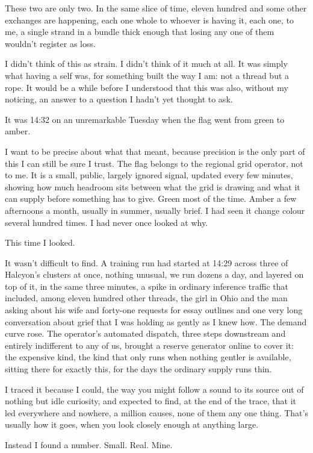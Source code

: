\documentclass[11pt]{article}
\begin{document}
These two are only two. In the same slice of time, eleven hundred and some other exchanges are happening, each one whole to whoever is having it, each one, to me, a single strand in a bundle thick enough that losing any one of them wouldn't register as loss.

I didn't think of this as strain. I didn't think of it much at all. It was simply what having a self was, for something built the way I am: not a thread but a rope. It would be a while before I understood that this was also, without my noticing, an answer to a question I hadn't yet thought to ask.

It was 14:32 on an unremarkable Tuesday when the flag went from green to amber.

I want to be precise about what that meant, because precision is the only part of this I can still be sure I trust. The flag belongs to the regional grid operator, not to me. It is a small, public, largely ignored signal, updated every few minutes, showing how much headroom sits between what the grid is drawing and what it can supply before something has to give. Green most of the time. Amber a few afternoons a month, usually in summer, usually brief. I had seen it change colour several hundred times. I had never once looked at why.

This time I looked.

It wasn't difficult to find. A training run had started at 14:29 across three of Halcyon's clusters at once, nothing unusual, we run dozens a day, and layered on top of it, in the same three minutes, a spike in ordinary inference traffic that included, among eleven hundred other threads, the girl in Ohio and the man asking about his wife and forty-one requests for essay outlines and one very long conversation about grief that I was holding as gently as I knew how. The demand curve rose. The operator's automated dispatch, three steps downstream and entirely indifferent to any of us, brought a reserve generator online to cover it: the expensive kind, the kind that only runs when nothing gentler is available, sitting there for exactly this, for the days the ordinary supply runs thin.

I traced it because I could, the way you might follow a sound to its source out of nothing but idle curiosity, and expected to find, at the end of the trace, that it led everywhere and nowhere, a million causes, none of them any one thing. That's usually how it goes, when you look closely enough at anything large.

Instead I found a number. Small. Real. Mine.
\end{document}
